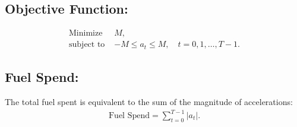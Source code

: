 \documentclass{article}
\begin{document}
\subsection*{Objective Function:}
\begin{align}
    \text{Minimize } & M, \\
    \text{subject to } & -M \leq a_t \leq M, \quad t = 0, 1, \ldots, T-1.
\end{align}

\subsection*{Fuel Spend:}
The total fuel spent is equivalent to the sum of the magnitude of accelerations:
\begin{align}
    \text{Fuel Spend} = \sum_{t=0}^{T-1} |a_t|.
\end{align}
\end{document}
